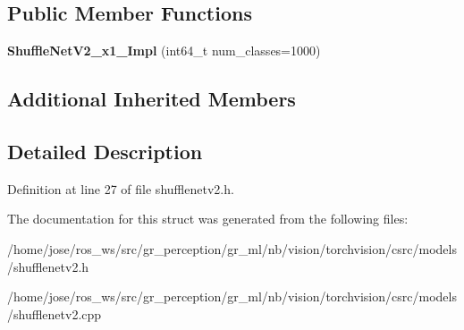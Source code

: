 \subsection*{Public Member Functions}
\begin{DoxyCompactItemize}
\item 
\mbox{\label{structvision_1_1models_1_1ShuffleNetV2__x1__0Impl_a685e297240a2d4e0523c0a17d0b4799a}} 
{\bfseries Shuffle\+Net\+V2\+\_\+x1\+\_\+Impl} (int64\+\_\+t num\+\_\+classes=1000)
\end{DoxyCompactItemize}
\subsection*{Additional Inherited Members}


\subsection{Detailed Description}


Definition at line 27 of file shufflenetv2.\+h.



The documentation for this struct was generated from the following files\+:\begin{DoxyCompactItemize}
\item 
/home/jose/ros\+\_\+ws/src/gr\+\_\+perception/gr\+\_\+ml/nb/vision/torchvision/csrc/models/shufflenetv2.\+h\item 
/home/jose/ros\+\_\+ws/src/gr\+\_\+perception/gr\+\_\+ml/nb/vision/torchvision/csrc/models/shufflenetv2.\+cpp\end{DoxyCompactItemize}
